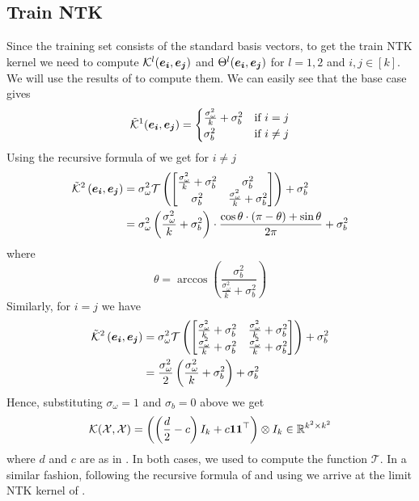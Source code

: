 \subsection{Train NTK}
Since the training set consists of the standard basis vectors, to get the train NTK kernel we need to compute $\mathcal{K}^{l}(\boldsymbol{e_i}, \boldsymbol{e_j})$ and $\Theta^{l}(\boldsymbol{e_i}, \boldsymbol{e_j})$ for $l = 1, 2$ and $i, j \in [k]$. We will use the results of  to compute them. We can easily see that the base case gives 
\begin{equation}
    \tilde{\mathcal{K}}^1(\boldsymbol{e_i}, \boldsymbol{e_j})=\begin{cases}
        \frac{\sigma_\omega^2}{k} + \sigma_b^2
 & \text{if } i=j \\
 \sigma_b^2 & \text{if } i \neq j\end{cases}
\end{equation}
Using the recursive formula of  we get for $i \neq j$
\begin{align}
    \tilde{\mathcal{K}}^2\left(\boldsymbol{e_i}, \boldsymbol{e_j}\right)&=\sigma_\omega^2 \mathcal{T}\left(\begin{bmatrix}
\frac{\sigma_\omega^2}{k}+\sigma_b^2 & \sigma_b^2 \\
\sigma_b^2 & \frac{\sigma_\omega^2}{k}+\sigma_b^2 
\end{bmatrix}\right)+\sigma_b^2 \nonumber \\
&= \sigma_\omega^2 \left(\frac{\sigma_\omega^2}{k} + \sigma_b^2 \right)\cdot \frac{\cos \theta \cdot (\pi - \theta) + \sin \theta}{2\pi} + \sigma_b^2
\end{align}
where 
\begin{equation}
    \theta = \arccos\left(\frac{\sigma_b^2}{\frac{\sigma_\omega^2}{k} + \sigma_b^2}\right)
\end{equation} Similarly, for $i = j$ we have 
\begin{align}
    \tilde{\mathcal{K}}^2\left(\boldsymbol{e_i}, \boldsymbol{e_j}\right)&=\sigma_\omega^2 \mathcal{T}\left(\begin{bmatrix}
\frac{\sigma_\omega^2}{k}+\sigma_b^2 & \frac{\sigma_\omega^2}{k}+\sigma_b^2 \\
\frac{\sigma_\omega^2}{k}+\sigma_b^2 & \frac{\sigma_\omega^2}{k}+\sigma_b^2 
\end{bmatrix}\right)+\sigma_b^2 \nonumber \\
&= \frac{\sigma_\omega^2}{2} \left(\frac{\sigma_\omega^2}{k} + \sigma_b^2 \right) + \sigma_b^2
\end{align}
Hence, substituting $\sigma_\omega=1$ and $\sigma_b=0$ above we get 
\begin{equation}
    \mathcal{K}(\mathcal{X}, \mathcal{X}) = \left(\left(\frac{d}{2} - c\right)I_k + c\boldsymbol{1}\boldsymbol{1}^\top\right) \otimes I_k \in \mathbb{R}^{k^2 \times k^2} 
\end{equation}
where $d$ and $c$ are as in . In both cases, we used  to compute the function $\mathcal{T}$. In a similar fashion, following the recursive formula of  and using  we arrive at the limit NTK kernel of .
